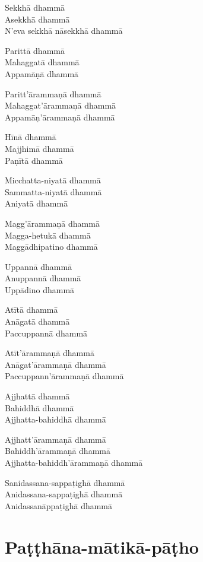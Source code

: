 \begin{paritta}
Sekkhā dhammā\\
Asekkhā dhammā\\
N'eva sekkhā nāsekkhā dhammā

Parittā dhammā\\
Mahaggatā dhammā\\
Appamāṇā dhammā

Paritt'ārammaṇā dhammā\\
Mahaggat'ārammaṇā dhammā\\
Appamāṇ'ārammaṇā dhammā

Hīnā dhammā\\
Majjhimā dhammā\\
Paṇītā dhammā

Micchatta-niyatā dhammā\\
Sammatta-niyatā dhammā\\
Aniyatā dhammā

Magg'ārammaṇā dhammā\\
Magga-hetukā dhammā\\
Maggādhipatino dhammā

\clearpage

Uppannā dhammā\\
Anuppannā dhammā\\
Uppādino dhammā

Atītā dhammā\\
Anāgatā dhammā\\
Paccuppannā dhammā

Atīt'ārammaṇā dhammā\\
Anāgat'ārammaṇā dhammā\\
Paccuppann'ārammaṇā dhammā

Ajjhattā dhammā\\
Bahiddhā dhammā\\
Ajjhatta-bahiddhā dhammā

Ajjhatt'ārammaṇā dhammā\\
Bahiddh'ārammaṇā dhammā\\
Ajjhatta-bahiddh'ārammaṇā dhammā

Sanidassana-sappaṭighā dhammā\\
Anidassana-sappaṭighā dhammā\\
Anidassanāppaṭighā dhammā
\end{paritta}

\chapter{Paṭṭhāna-mātikā-pāṭho}%


